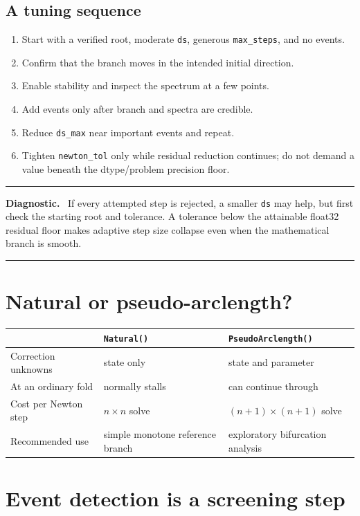 \documentclass[11pt,oneside]{book}
\newenvironment{diagnosticbox}
  {\par\medskip\noindent\begin{minipage}{\textwidth}
   \color{JaxOrange!90!black}\rule{\textwidth}{0.8pt}\par
   \textbf{Diagnostic.}\ \color{black}}
  {\par\color{JaxOrange!90!black}\rule{\textwidth}{0.8pt}
   \end{minipage}\par\medskip}
\begin{document}
\subsection{A tuning sequence}

\begin{enumerate}
  \item Start with a verified root, moderate \texttt{ds}, generous
        \texttt{max\_steps}, and no events.
  \item Confirm that the branch moves in the intended initial direction.
  \item Enable stability and inspect the spectrum at a few points.
  \item Add events only after branch and spectra are credible.
  \item Reduce \texttt{ds\_max} near important events and repeat.
  \item Tighten \texttt{newton\_tol} only while residual reduction continues;
        do not demand a value beneath the dtype/problem precision floor.
\end{enumerate}

\begin{diagnosticbox}
If every attempted step is rejected, a smaller \texttt{ds} may help, but first
check the starting root and tolerance. A tolerance below the attainable
float32 residual floor makes adaptive step size collapse even when the
mathematical branch is smooth.
\end{diagnosticbox}

\section{Natural or pseudo-arclength?}

\begin{tabularx}{\textwidth}{p{}XX}
\toprule
 & \texttt{Natural()} & \texttt{PseudoArclength()}\\
\midrule
Correction unknowns & state only & state and parameter\\
At an ordinary fold & normally stalls & can continue through\\
Cost per Newton step & $n\times n$ solve & $(n+1)\times(n+1)$ solve\\
Recommended use & simple monotone reference branch & exploratory
bifurcation analysis\\
\bottomrule
\end{tabularx}

\section{Event detection is a screening step}
\end{document}
